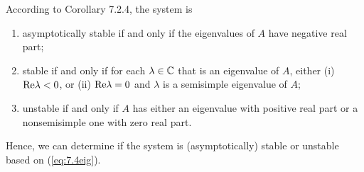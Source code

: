 According to Corollary 7.2.4, the system is 
\vspace{-1em}
\begin{enumerate}
    \item asymptotically stable if and only if the eigenvalues of $A$ have negative real part;
    \item stable if and only if for each $\lambda\in\mathbb{C}$ that is an eigenvalue of $A$, either (i) $\textnormal{Re}\lambda<0$, or (ii) $\textnormal{Re}\lambda=0$ and $\lambda$ is a semisimple eigenvalue of $A$;
    \item unstable if and only if $A$ has either an eigenvalue with positive real part or a nonsemisimple one with zero real part.
\end{enumerate}
\vspace{-1em}

Hence, we can determine if the system is (asymptotically) stable or unstable based on (\ref{eq:7.4eig}).
\vspace{-1em}
